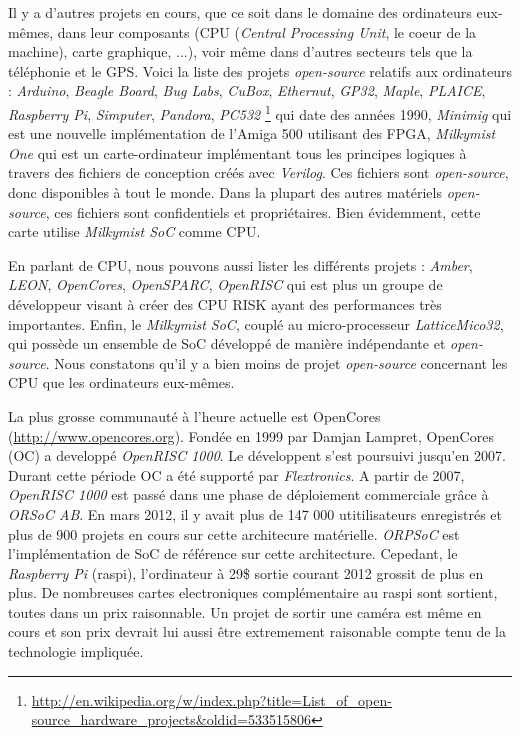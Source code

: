Il y a d'autres projets en cours, que ce soit dans le domaine des ordinateurs eux-mêmes, dans leur composants (CPU (\textit{Central Processing Unit}, le coeur de la machine), carte graphique, ...), voir même dans d'autres secteurs tels que la téléphonie et le GPS. Voici la liste des projets \textit{open-source} relatifs aux ordinateurs : \textit{Arduino}, \textit{Beagle Board}, \textit{Bug Labs}, \textit{CuBox}, \textit{Ethernut}, \textit{GP32}, \textit{Maple}, \textit{PLAICE}, \textit{Raspberry Pi}, \textit{Simputer}, \textit{Pandora}, \textit{PC532} \footnote{\url{http://en.wikipedia.org/w/index.php?title=List_of_open-source_hardware_projects&oldid=533515806}}
qui date des années 1990, \textit{Minimig} qui est une nouvelle implémentation de l'Amiga 500 utilisant des FPGA, \textit{Milkymist One} qui est un carte-ordinateur implémentant tous les principes logiques à travers des fichiers de conception créés avec \textit{Verilog}. Ces fichiers sont \textit{open-source}, donc disponibles à tout le monde. Dans la plupart des autres matériels \textit{open-source}, ces fichiers sont confidentiels et propriétaires. Bien évidemment, cette carte utilise \textit{Milkymist SoC} comme CPU.

En parlant de CPU, nous pouvons aussi lister les différents projets : \textit{Amber}, \textit{LEON}, \textit{OpenCores}, \textit{OpenSPARC}, \textit{OpenRISC} qui est plus un groupe de développeur visant à créer des CPU RISK ayant des performances très importantes. Enfin, le \textit{Milkymist SoC}, couplé au micro-processeur \textit{LatticeMico32}, qui possède un ensemble de SoC développé de manière indépendante et \textit{open-source}. Nous constatons qu'il y a bien moins de projet \textit{open-source} concernant les CPU que les ordinateurs eux-mêmes.

La plus grosse communauté à l'heure actuelle est OpenCores (\url{http://www.opencores.org}). Fondée en 1999 par Damjan Lampret, OpenCores (OC) a developpé \textit{OpenRISC 1000}. Le développent s'est poursuivi jusqu'en 2007. Durant cette période OC a été supporté par \textit{Flextronics}. A partir de 2007, \textit{OpenRISC 1000} est passé dans une phase de déploiement commerciale grâce à \textit{ORSoC AB}. En mars 2012, il y avait plus de 147 000 utitilisateurs enregistrés et plus de 900 projets en cours sur cette architecure matérielle. \textit{ORPSoC} est l'implémentation de SoC de référence sur cette architecture. Cepedant, le \textit{Raspberry Pi} (raspi), l'ordinateur à 29\$ sortie courant 2012 grossit de plus en plus. De nombreuses cartes electroniques complémentaire au raspi sont sortient, toutes dans un prix raisonnable. Un projet de sortir une caméra est même en cours et son prix devrait lui aussi être extremement raisonable compte tenu de la technologie impliquée. 


